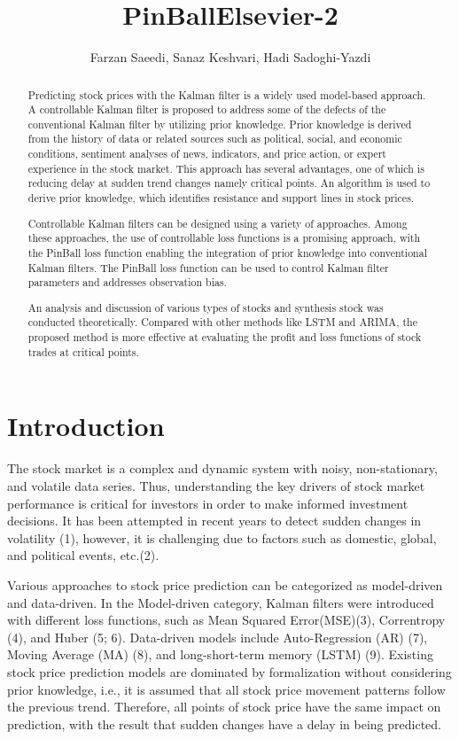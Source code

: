 \documentclass[12pt,a4paper]{article}
\title{PinBallElsevier-2}
\author{Farzan Saeedi, Sanaz Keshvari, Hadi Sadoghi-Yazdi}
\date{}
\begin{document}
	
	\maketitle
	
	\begin{abstract}
		Predicting stock prices with the Kalman filter is a widely used model-based approach. A controllable Kalman filter is proposed to address some of the defects of the conventional Kalman filter by utilizing prior knowledge. Prior knowledge is derived from the history of data or related sources such as political, social, and economic conditions, sentiment analyses of news, indicators, and price action, or expert experience in the stock market. This approach has several advantages, one of which is reducing delay at sudden trend changes namely critical points. An algorithm is used to derive prior knowledge, which identifies resistance and support lines in stock prices.
		
		Controllable Kalman filters can be designed using a variety of approaches. Among these approaches, the use of controllable loss functions is a promising approach, with the PinBall loss function enabling the integration of prior knowledge into conventional Kalman filters. The PinBall loss function can be used to control Kalman filter parameters and addresses observation bias.
		
		An analysis and discussion of various types of stocks and synthesis stock was conducted theoretically. Compared with other methods like LSTM and ARIMA, the proposed method is more effective at evaluating the profit and loss functions of stock trades at critical points.
	\end{abstract}
	
	\section{Introduction}
	
	The stock market is a complex and dynamic system with noisy, non-stationary, and volatile data series. Thus, understanding the key drivers of stock market performance is critical for investors in order to make informed investment decisions. It has been attempted in recent years to detect sudden changes in volatility (1), however, it is challenging due to factors such as domestic, global, and political events, etc.(2).
	
	Various approaches to stock price prediction can be categorized as model-driven and data-driven. In the Model-driven category, Kalman filters were introduced with different loss functions, such as Mean Squared Error(MSE)(3), Correntropy (4), and Huber (5; 6). Data-driven models include Auto-Regression (AR) (7), Moving Average (MA) (8), and long-short-term memory (LSTM) (9). Existing stock price prediction models are dominated by formalization without considering prior knowledge, i.e., it is assumed that all stock price movement patterns follow the previous trend. Therefore, all points of stock price have the same impact on prediction, with the result that sudden changes have a delay in being predicted.
	
\end{document}
